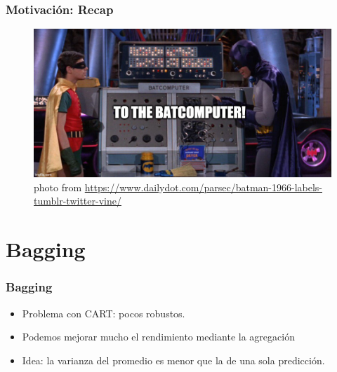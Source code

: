 \documentclass[
  shownotes,
  xcolor={svgnames},
  hyperref={colorlinks,citecolor=DarkBlue,linkcolor=andesred,urlcolor=DarkBlue}
  , aspectratio=169]{beamer}
\begin{document}
\begin{frame}[fragile]
\frametitle{Motivación: Recap}
\begin{figure}[H] \centering
  \centering
  \includegraphics[scale=0.35]{figures/baticomputer_meme.jpg}
  \\
  \tiny photo from \url{https://www.dailydot.com/parsec/batman-1966-labels-tumblr-twitter-vine/}
\end{figure}

\end{frame}


\section{Bagging }
\begin{frame}[fragile]
\frametitle{Bagging}

\begin{itemize}
  \item Problema con CART: pocos robustos.
  \medskip
   \item Podemos mejorar mucho el rendimiento mediante la agregación 
   \medskip
     \item Idea: la varianza del promedio es menor que la de una sola predicción.
\end{itemize}

\end{frame}
\end{document}
